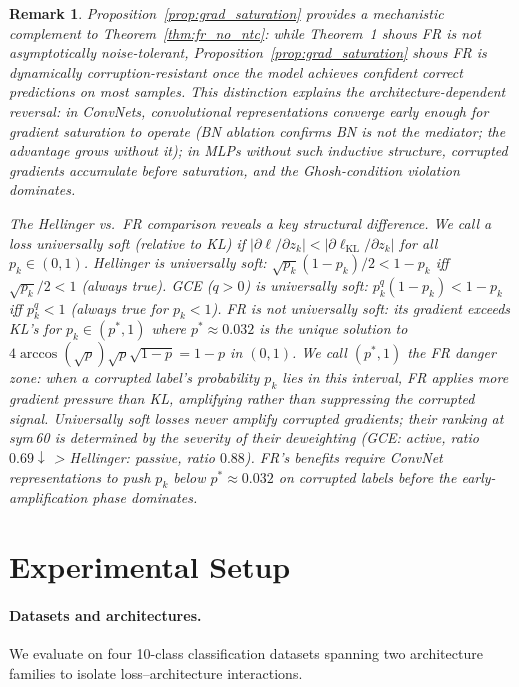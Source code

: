 \documentclass[11pt]{article}
\newtheorem{remark}{Remark}
\begin{document}
\begin{remark}
Proposition~\ref{prop:grad_saturation} provides a mechanistic complement to
Theorem~\ref{thm:fr_no_ntc}: while Theorem~1 shows FR is not
\emph{asymptotically} noise-tolerant, Proposition~\ref{prop:grad_saturation}
shows FR is \emph{dynamically} corruption-resistant once the model achieves
confident correct predictions on most samples.
This distinction explains the architecture-dependent reversal:
in ConvNets, convolutional representations converge early enough
for gradient saturation to operate (BN ablation confirms BN is not the mediator;
the advantage grows without it); in MLPs without such inductive structure,
corrupted gradients accumulate before saturation, and the Ghosh-condition
violation dominates.

The Hellinger vs.\ FR comparison reveals a key structural difference.
We call a loss \emph{universally soft} (relative to KL) if $|\partial\ell/\partial z_k| < |\partial\ell_\mathrm{KL}/\partial z_k|$ for all $p_k\in(0,1)$.
Hellinger is universally soft: $\sqrt{p_k}(1-p_k)/2 < 1-p_k$ iff $\sqrt{p_k}/2 < 1$ (always true).
GCE ($q>0$) is universally soft: $p_k^q(1-p_k) < 1-p_k$ iff $p_k^q < 1$ (always true for $p_k<1$).
FR is \emph{not} universally soft: its gradient exceeds KL's for $p_k \in (p^*, 1)$
where $p^* \approx 0.032$ is the unique solution to
$4\arccos(\sqrt{p})\sqrt{p}\sqrt{1-p} = 1-p$ in $(0,1)$.
We call $(p^*, 1)$ the \emph{FR danger zone}: when a corrupted label's probability
$p_k$ lies in this interval, FR applies \emph{more} gradient pressure than KL,
amplifying rather than suppressing the corrupted signal.
Universally soft losses never amplify corrupted gradients; their ranking at sym\,60 is
determined by the severity of their deweighting (GCE: active, ratio $0.69\downarrow$ > Hellinger: passive, ratio $0.88$).
FR's benefits require ConvNet representations to push $p_k$ below $p^* \approx 0.032$ on corrupted labels before the early-amplification phase dominates.
\end{remark}

\section{Experimental Setup}
\label{sec:setup}

\paragraph{Datasets and architectures.}
We evaluate on four 10-class classification datasets spanning two architecture
families to isolate loss--architecture interactions.
\end{document}
